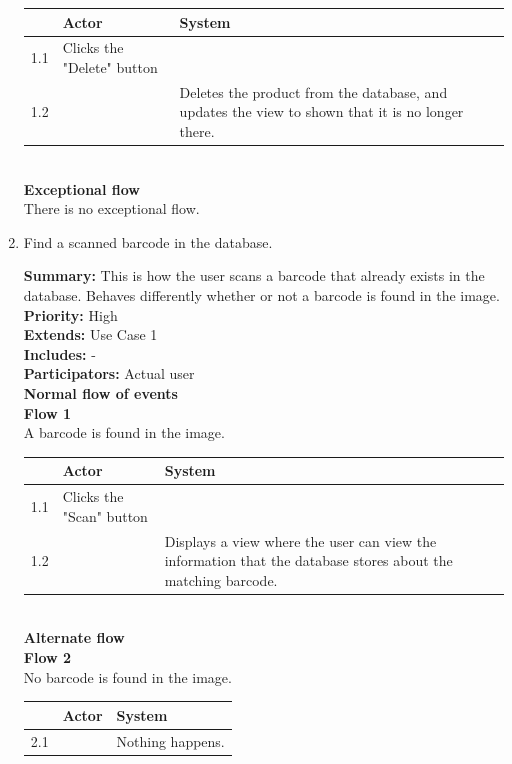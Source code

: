 \documentclass{report}
\begin{document}
\begin{enumerate}
    \begin{tabular}{ | l | p{4cm} | p{4cm} |}
    \hline
      & Actor & System \\ \hline
    1.1 & Clicks the "Delete" button & \\ \hline
    1.2 & & Deletes the product from the database, and updates the view to shown that it is no longer there. \\
    \hline
    \end{tabular} \\

    \textbf{Exceptional flow} \\ There is no exceptional flow.

\pagebreak

  \item Find a scanned barcode in the database. \

    \textbf{Summary:} This is how the user scans a barcode that already exists in the database. Behaves differently whether or not a barcode is found in the image. \\
    \textbf{Priority:} High \\
    \textbf{Extends:} Use Case 1 \\
    \textbf{Includes:} - \\
    \textbf{Participators:} Actual user \\
    \textbf{Normal flow of events} \\
    \textbf{Flow 1} \\ A barcode is found in the image. \\

    \begin{tabular}{ | l | p{4cm} | p{4cm} |}
    \hline
      & Actor & System \\ \hline
    1.1 & Clicks the "Scan" button & \\ \hline
    1.2 & & Displays a view where the user can view the information that the database stores about the matching barcode. \\
    \hline
    \end{tabular} \\

    \textbf{Alternate flow} \\
    \textbf{Flow 2} \\ No barcode is found in the image. \\

    \begin{tabular}{ | l | p{4cm} | p{4cm} |}
    \hline
      & Actor & System \\ \hline
    2.1 & & Nothing happens. \\
    \hline
    \end{tabular} \\


\end{enumerate}
\end{document}
